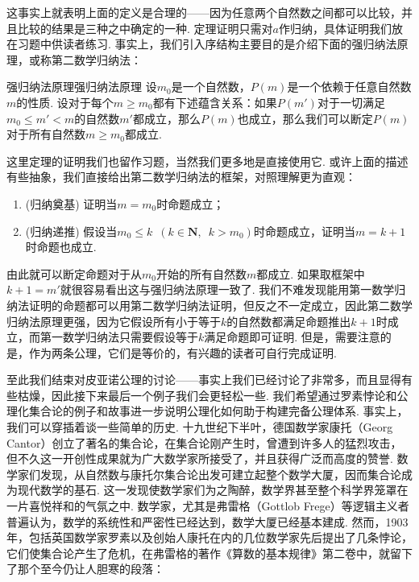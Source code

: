 这事实上就表明上面的定义是合理的——因为任意两个自然数之间都可以比较，并且比较的结果是三种之中确定的一种. 定理证明只需对$a$作归纳，具体证明我们放在习题中供读者练习. 事实上，我们引入序结构主要目的是介绍下面的强归纳法原理，或称第二数学归纳法：

\begin{theorem}{强归纳法原理}{强归纳法原理}
    设$m_0$是一个自然数，$P(m)$是一个依赖于任意自然数$m$的性质. 设对于每个$m\geqslant m_0$都有下述蕴含关系：如果$P(m')$对于一切满足$m_0\leqslant m'<m$的自然数$m'$都成立，那么$P(m)$也成立，那么我们可以断定$P(m)$对于所有自然数$m\geqslant m_0$都成立.
\end{theorem}

这里定理的证明我们也留作习题，当然我们更多地是直接使用它. 或许上面的描述有些抽象，我们直接给出第二数学归纳法的框架，对照理解更为直观：
\begin{enumerate}
    \item (归纳奠基) 证明当$m=m_0$时命题成立；

    \item (归纳递推) 假设当$m_0\leqslant k\enspace(k\in\mathbf{N},\enspace k>m_0)$时命题成立，证明当$m=k+1$时命题也成立.
\end{enumerate}
由此就可以断定命题对于从$m_0$开始的所有自然数$m$都成立. 如果取框架中$k+1=m'$就很容易看出这与强归纳法原理一致了. 我们不难发现能用第一数学归纳法证明的命题都可以用第二数学归纳法证明，但反之不一定成立，因此第二数学归纳法原理更强，因为它假设所有小于等于$k$的自然数都满足命题推出$k+1$时成立，而第一数学归纳法只需要假设等于$k$满足命题即可证明. 但是，需要注意的是，作为两条公理，它们是等价的，有兴趣的读者可自行完成证明.

至此我们结束对皮亚诺公理的讨论——事实上我们已经讨论了非常多，而且显得有些枯燥，因此接下来最后一个例子我们会更轻松一些. 我们希望通过罗素悖论和公理化集合论的例子和故事进一步说明公理化如何助于构建完备公理体系. 事实上，我们可以穿插着谈一些简单的历史. 十九世纪下半叶，德国数学家康托（Georg Cantor）创立了著名的集合论，在集合论刚产生时，曾遭到许多人的猛烈攻击，但不久这一开创性成果就为广大数学家所接受了，并且获得广泛而高度的赞誉. 数学家们发现，从自然数与康托尔集合论出发可建立起整个数学大厦，因而集合论成为现代数学的基石. 这一发现使数学家们为之陶醉，数学界甚至整个科学界笼罩在一片喜悦祥和的气氛之中. 数学家，尤其是弗雷格（Gottlob Frege）等逻辑主义者普遍认为，数学的系统性和严密性已经达到，数学大厦已经基本建成. 然而，1903年，包括英国数学家罗素以及创始人康托在内的几位数学家先后提出了几条悖论，它们使集合论产生了危机，在弗雷格的著作《算数的基本规律》第二卷中，就留下了那个至今仍让人胆寒的段落：

